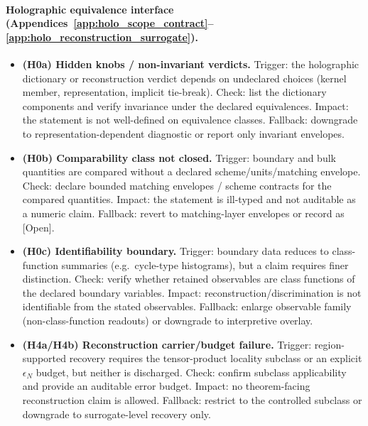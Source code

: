 \paragraph{Holographic equivalence interface (Appendices~\ref{app:holo_scope_contract}--\ref{app:holo_reconstruction_surrogate}).}
\begin{itemize}
\item \textbf{(H0a) Hidden knobs / non-invariant verdicts.}
  Trigger: the holographic dictionary or reconstruction verdict depends on undeclared choices (kernel member, representation, implicit tie-break).
  Check: list the dictionary components and verify invariance under the declared equivalences.
  Impact: the statement is not well-defined on equivalence classes.
  Fallback: downgrade to representation-dependent diagnostic or report only invariant envelopes.
\item \textbf{(H0b) Comparability class not closed.}
  Trigger: boundary and bulk quantities are compared without a declared scheme/units/matching envelope.
  Check: declare bounded matching envelopes / scheme contracts for the compared quantities.
  Impact: the statement is ill-typed and not auditable as a numeric claim.
  Fallback: revert to matching-layer envelopes or record as \textsf{[Open]}.
\item \textbf{(H0c) Identifiability boundary.}
  Trigger: boundary data reduces to class-function summaries (e.g.\ cycle-type histograms), but a claim requires finer distinction.
  Check: verify whether retained observables are class functions of the declared boundary variables.
  Impact: reconstruction/discrimination is not identifiable from the stated observables.
  Fallback: enlarge observable family (non-class-function readouts) or downgrade to interpretive overlay.
\item \textbf{(H4a/H4b) Reconstruction carrier/budget failure.}
  Trigger: region-supported recovery requires the tensor-product locality subclass or an explicit $\epsilon_N$ budget, but neither is discharged.
  Check: confirm subclass applicability and provide an auditable error budget.
  Impact: no theorem-facing reconstruction claim is allowed.
  Fallback: restrict to the controlled subclass or downgrade to surrogate-level recovery only.
\end{itemize}


